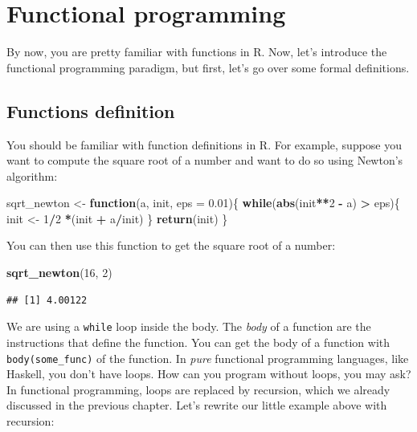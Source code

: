 \documentclass[]{gitbook}
\newenvironment{Shaded}{\begin{snugshade}}{\end{snugshade}}
\newcommand{\ControlFlowTok}[1]{\textcolor[rgb]{0.13,0.29,0.53}{\textbf{#1}}}
\newcommand{\DataTypeTok}[1]{\textcolor[rgb]{0.13,0.29,0.53}{#1}}
\newcommand{\DecValTok}[1]{\textcolor[rgb]{0.00,0.00,0.81}{#1}}
\newcommand{\FloatTok}[1]{\textcolor[rgb]{0.00,0.00,0.81}{#1}}
\newcommand{\KeywordTok}[1]{\textcolor[rgb]{0.13,0.29,0.53}{\textbf{#1}}}
\newcommand{\NormalTok}[1]{#1}
\newcommand{\OperatorTok}[1]{\textcolor[rgb]{0.81,0.36,0.00}{\textbf{#1}}}
\newcommand{\StringTok}[1]{\textcolor[rgb]{0.31,0.60,0.02}{#1}}
\theoremstyle{definition}
\theoremstyle{definition}
\theoremstyle{definition}
\theoremstyle{remark}
\begin{document}
\hypertarget{functional-programming}{%
\section{Functional programming}\label{functional-programming}}

By now, you are pretty familiar with functions in R. Now, let's
introduce the functional programming paradigm, but first, let's go over
some formal definitions.

\hypertarget{functions-definition}{%
\subsection{Functions definition}\label{functions-definition}}

You should be familiar with function definitions in R. For example,
suppose you want to compute the square root of a number and want to do
so using Newton's algorithm:

\begin{Shaded}
\begin{Highlighting}[]
\NormalTok{sqrt_newton <-}\StringTok{ }\ControlFlowTok{function}\NormalTok{(a, init, }\DataTypeTok{eps =} \FloatTok{0.01}\NormalTok{)\{}
    \ControlFlowTok{while}\NormalTok{(}\KeywordTok{abs}\NormalTok{(init}\OperatorTok{**}\DecValTok{2} \OperatorTok{-}\StringTok{ }\NormalTok{a) }\OperatorTok{>}\StringTok{ }\NormalTok{eps)\{}
\NormalTok{        init <-}\StringTok{ }\DecValTok{1}\OperatorTok{/}\DecValTok{2} \OperatorTok{*}\NormalTok{(init }\OperatorTok{+}\StringTok{ }\NormalTok{a}\OperatorTok{/}\NormalTok{init)}
\NormalTok{    \}}
    \KeywordTok{return}\NormalTok{(init)}
\NormalTok{\}}
\end{Highlighting}
\end{Shaded}

You can then use this function to get the square root of a number:

\begin{Shaded}
\begin{Highlighting}[]
\KeywordTok{sqrt_newton}\NormalTok{(}\DecValTok{16}\NormalTok{, }\DecValTok{2}\NormalTok{)}
\end{Highlighting}
\end{Shaded}

\begin{verbatim}
## [1] 4.00122
\end{verbatim}

We are using a \texttt{while} loop inside the body. The \emph{body} of a
function are the instructions that define the function. You can get the
body of a function with \texttt{body(some\_func)} of the function. In
\emph{pure} functional programming languages, like Haskell, you don't
have loops. How can you program without loops, you may ask? In
functional programming, loops are replaced by recursion, which we
already discussed in the previous chapter. Let's rewrite our little
example above with recursion:
\end{document}
